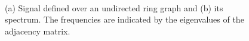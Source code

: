 \begin{figure}
	\centering
    \caption{(a) Signal defined over an undirected ring graph and (b) its spectrum. The frequencies are indicated by the eigenvalues of the adjacency matrix.}%
	\begin{minipage}[c]{0.25\linewidth}
	\end{minipage}~
	\begin{minipage}[c]{0.25\linewidth}
	\end{minipage}%
	\floatsource
	\label{fig:diff_struct_GSPA}%
	\vspace{-0.2cm}
\end{figure}

